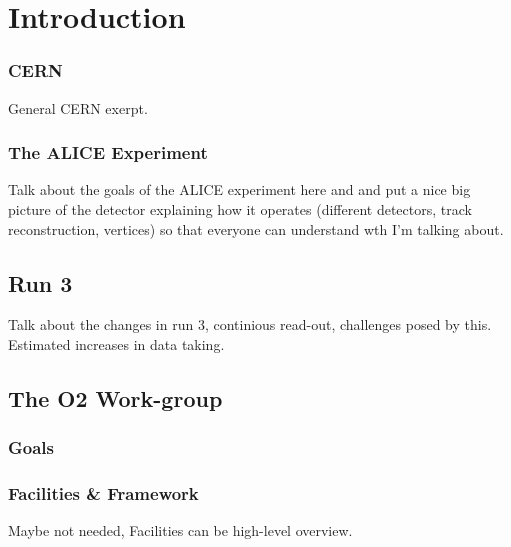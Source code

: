 \documentclass[a4paper]{report}
\begin{document}
\chapter{Introduction}
\subsection{CERN}
General CERN exerpt.
\subsection{The ALICE Experiment}
Talk about the goals of the ALICE experiment here and and put a nice big picture of the detector explaining how it operates (different detectors, track reconstruction, vertices)
so that everyone can understand wth I'm talking about.

\section{Run 3}
Talk about the changes in run 3, continious read-out, challenges posed by this. Estimated increases in data taking.
\section{The O2 Work-group}
\subsection{Goals}
\subsection{Facilities \& Framework}
Maybe not needed, Facilities can be high-level overview.
\newpage
\end{document}
